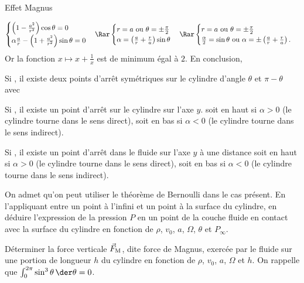 \begin{exo}[PC][1][devoir]{Effet Magnus}
\begin{quest}
{$$
\begin{cases}
  \left(1-\frac{a^2}{r^2}\right)\cos\theta = 0 \\
\alpha\frac{a}{r}-\left(1+\frac{a^2}{r^2}\right)\sin\theta = 0 
\end{cases} \Rar 
\begin{cases}
  r = a \text{ ou } \theta=\pm\frac{\pi}{2}\\
\alpha = \left( \frac{a}{r} + \frac{r}{a} \right)\sin\theta 
\end{cases} \Rar 
\begin{cases}
  r = a \text{ ou } \theta=\pm\frac{\pi}{2}\\
\frac{\alpha}{2} = \sin\theta \text{ ou } \alpha = \pm \left( \frac{a}{r} + \frac{r}{a} \right).
\end{cases}
$$
Or la fonction $x \mapsto x+\frac{1}{x}$ est de minimum égal à $2$. En conclusion,
\begin{liste}
  \item Si , il existe deux points d'arrêt symétriques sur le cylindre d'angle $\theta$ et $\pi-\theta$ avec
  \item Si , il existe un point d'arrêt sur le cylindre sur l'axe $y$. soit en haut si $\alpha >0$ (le cylindre tourne dans le sens direct), soit en bas si $\alpha <0$ (le cylindre tourne dans le sens indirect).
  \item Si , il existe un point d'arrêt dans le fluide sur l'axe $y$ à une distance 
  soit en haut si $\alpha >0$ (le cylindre tourne dans le sens direct), soit en bas si $\alpha <0$ (le cylindre tourne dans le sens indirect).
\end{liste}
}
\item On admet qu'on peut utiliser le théorème de Bernoulli dans le cas présent. En l'appliquant entre un point à l'infini et un point à la surface du cylindre, en déduire l'expression de la pression $P$ en un point de la couche fluide en contact avec la surface du cylindre en fonction de $\rho$, $v_0$, $a$, $\Omega$, $\theta$ et $P_{\infty}$.
\item Déterminer la force verticale $\vec{F}_{\rm{M}}$, dite force de Magnus, exercée par le fluide sur une portion de longueur $h$ du cylindre en fonction de $\rho$, $v_0$, $a$, $\Omega$ et $h$. On rappelle que $\textstyle\int_{0}^{2\pi}\sin^{3}\theta\,\der\theta=0$.


\end{quest}
\end{exo}
